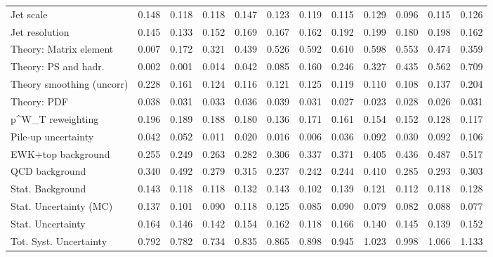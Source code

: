 \begin{tabular}{l|p{0.6cm}p{0.6cm}p{0.6cm}p{0.6cm}p{0.6cm}p{0.6cm}p{0.6cm}p{0.6cm}p{0.6cm}p{0.6cm}p{0.6cm}}
Jet scale                                & 0.148 & 0.118 & 0.118 & 0.147 & 0.123 & 0.119 & 0.115 & 0.129 & 0.096 & 0.115 & 0.126 \\
Jet resolution                           & 0.145 & 0.133 & 0.152 & 0.169 & 0.167 & 0.162 & 0.192 & 0.199 & 0.180 & 0.198 & 0.162 \\
Theory: Matrix element                   & 0.007 & 0.172 & 0.321 & 0.439 & 0.526 & 0.592 & 0.610 & 0.598 & 0.553 & 0.474 & 0.359 \\
Theory: PS and hadr.                     & 0.002 & 0.001 & 0.014 & 0.042 & 0.085 & 0.160 & 0.246 & 0.327 & 0.435 & 0.562 & 0.709 \\
Theory smoothing (uncorr)                & 0.228 & 0.161 & 0.124 & 0.116 & 0.121 & 0.125 & 0.119 & 0.110 & 0.108 & 0.137 & 0.204 \\
Theory: PDF                              & 0.038 & 0.031 & 0.033 & 0.036 & 0.039 & 0.031 & 0.027 & 0.023 & 0.028 & 0.026 & 0.031 \\
p^{W}_{T} reweighting                    & 0.196 & 0.189 & 0.188 & 0.180 & 0.136 & 0.171 & 0.161 & 0.154 & 0.152 & 0.128 & 0.117 \\
Pile-up uncertainty                      & 0.042 & 0.052 & 0.011 & 0.020 & 0.016 & 0.006 & 0.036 & 0.092 & 0.030 & 0.092 & 0.106 \\
EWK+top background                       & 0.255 & 0.249 & 0.263 & 0.282 & 0.306 & 0.337 & 0.371 & 0.405 & 0.436 & 0.487 & 0.517 \\
QCD background                           & 0.340 & 0.492 & 0.279 & 0.315 & 0.237 & 0.242 & 0.244 & 0.410 & 0.285 & 0.293 & 0.303 \\
Stat. Background                         & 0.143 & 0.118 & 0.118 & 0.132 & 0.143 & 0.102 & 0.139 & 0.121 & 0.112 & 0.118 & 0.128 \\
Stat. Uncertainty (MC)                   & 0.137 & 0.101 & 0.090 & 0.118 & 0.125 & 0.085 & 0.090 & 0.079 & 0.082 & 0.088 & 0.077 \\
\hline
Stat. Uncertainty                        & 0.164 & 0.146 & 0.142 & 0.154 & 0.162 & 0.118 & 0.166 & 0.140 & 0.145 & 0.139 & 0.152 \\
\hline
Tot. Syst. Uncertainty                   & 0.792 & 0.782 & 0.734 & 0.835 & 0.865 & 0.898 & 0.945 & 1.023 & 0.998 & 1.066 & 1.133 \\
\hline
\end{tabular}
